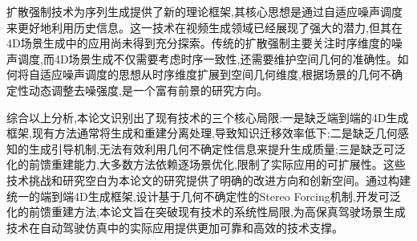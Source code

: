 扩散强制技术为序列生成提供了新的理论框架,其核心思想是通过自适应噪声调度来更好地利用历史信息。这一技术在视频生成领域已经展现了强大的潜力,但其在4D场景生成中的应用尚未得到充分探索。传统的扩散强制主要关注时序维度的噪声调度,而4D场景生成不仅需要考虑时序一致性,还需要维护空间几何的准确性。如何将自适应噪声调度的思想从时序维度扩展到空间几何维度,根据场景的几何不确定性动态调整去噪强度,是一个富有前景的研究方向。

综合以上分析,本论文识别出了现有技术的三个核心局限:一是缺乏端到端的4D生成框架,现有方法通常将生成和重建分离处理,导致知识迁移效率低下;二是缺乏几何感知的生成引导机制,无法有效利用几何不确定性信息来提升生成质量;三是缺乏可泛化的前馈重建能力,大多数方法依赖逐场景优化,限制了实际应用的可扩展性。这些技术挑战和研究空白为本论文的研究提供了明确的改进方向和创新空间。通过构建统一的端到端4D生成框架,设计基于几何不确定性的Stereo Forcing机制,开发可泛化的前馈重建方法,本论文旨在突破现有技术的系统性局限,为高保真驾驶场景生成技术在自动驾驶仿真中的实际应用提供更加可靠和高效的技术支撑。

